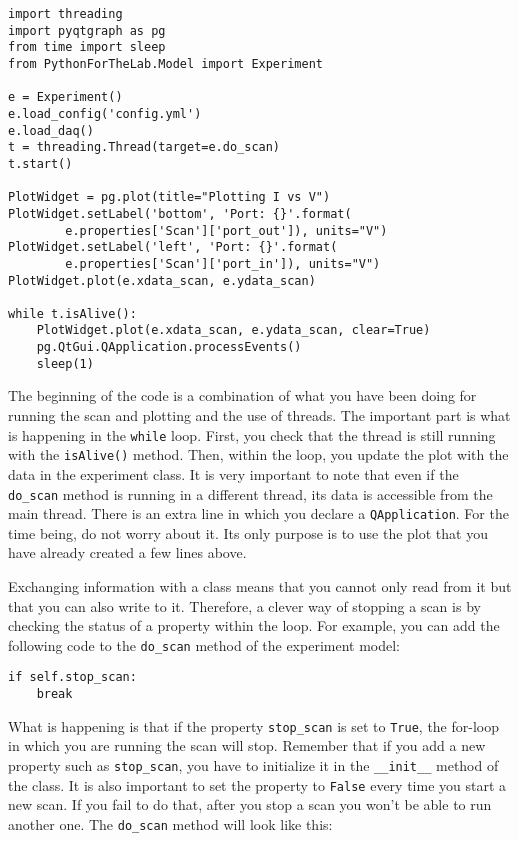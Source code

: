 \begin{verbatim}
import threading
import pyqtgraph as pg
from time import sleep
from PythonForTheLab.Model import Experiment

e = Experiment()
e.load_config('config.yml')
e.load_daq()
t = threading.Thread(target=e.do_scan)
t.start()

PlotWidget = pg.plot(title="Plotting I vs V")
PlotWidget.setLabel('bottom', 'Port: {}'.format(
        e.properties['Scan']['port_out']), units="V")
PlotWidget.setLabel('left', 'Port: {}'.format(
        e.properties['Scan']['port_in']), units="V")
PlotWidget.plot(e.xdata_scan, e.ydata_scan)

while t.isAlive():
    PlotWidget.plot(e.xdata_scan, e.ydata_scan, clear=True)
    pg.QtGui.QApplication.processEvents()
    sleep(1)
\end{verbatim}

The beginning of the code is a combination of what you have been doing
for running the scan and plotting and the use of threads. The important
part is what is happening in the \texttt{while} loop. First, you check
that the thread is still running with the \texttt{isAlive()} method.
Then, within the loop, you update the plot with the data in the
experiment class. It is very important to note that even if the
\texttt{do_scan} method is running in a different thread, its data is
accessible from the main thread. There is an extra line in which you
declare a \texttt{QApplication}. For the time being, do not worry about
it. Its only purpose is to use the plot that you have already created a
few lines above.

Exchanging information with a class means that you cannot only read from
it but that you can also write to it. Therefore, a clever way of
stopping a scan is by checking the status of a property within the loop.
For example, you can add the following code to the \texttt{do_scan}
method of the experiment model:

\begin{verbatim}
if self.stop_scan:
    break
\end{verbatim}

What is happening is that if the property \texttt{stop_scan} is set to
\texttt{True}, the for-loop in which you are running the scan will stop.
Remember that if you add a new property such as \texttt{stop_scan}, you
have to initialize it in the \texttt{__init__} method of the class.
It is also important to set the property to \texttt{False} every time
you start a new scan. If you fail to do that, after you stop a scan you
won't be able to run another one. The \texttt{do_scan} method will look
like this:

